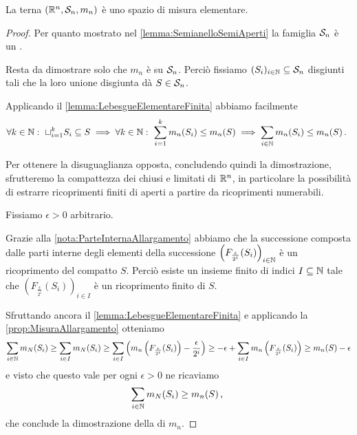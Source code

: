\begin{theorem}\label{thm:LebesguePremisura}
	La terna $(\R^n,\S_n,m_n)$ è uno spazio di misura elementare.
\end{theorem}
\begin{proof}
	Per quanto mostrato nel \cref{lemma:SemianelloSemiAperti} la famiglia $\S_n$ è un \semiring{}.
	
	Resta da dimostrare solo che $m_n$ è \sigadd{} su $\S_n$.
	Perciò fissiamo $(S_i)_{i\in\N}\subseteq \S_n$ disgiunti tali che la loro unione disgiunta dà $S\in\S_n$.
	
	Applicando il \cref{lemma:LebesgueElementareFinita} abbiamo facilmente
	\begin{equation*}
		\forall k\in\N:\ \sqcup_{i=1}^k S_i\subseteq S\implies \forall k\in\N:\ \sum_{i=1}^k m_n(S_i)\le m_n(S) \implies \sum_{i\in\N}m_n(S_i)\le m_n(S) \punto
	\end{equation*}

	Per ottenere la disuguaglianza opposta, concludendo quindi la dimostrazione, sfrutteremo la compattezza dei chiusi e limitati di $\R^n$, in particolare la possibilità di estrarre ricoprimenti finiti di aperti a partire da ricoprimenti numerabili.
	
	Fissiamo $\epsilon>0$ arbitrario.
	
	Grazie alla \cref{nota:ParteInternaAllargamento} abbiamo che la successione composta dalle parti interne degli elementi della successione $\left(F_{\frac\epsilon{2^i}}(S_i)\right)_{i\in\N}$ è un ricoprimento del compatto $S$.
	Perciò esiste un insieme finito di indici $I\subseteq \N$ tale che $\left(F_{\frac\epsilon{2^i}}(S_i)\right)_{i\in I}$ è un ricoprimento finito di $S$.
	
	Sfruttando ancora il \cref{lemma:LebesgueElementareFinita} e applicando la \cref{prop:MisuraAllargamento} otteniamo
	\begin{equation*}
		\sum_{i\in\N}m_N(S_i)\ge \sum_{i\in I}m_N(S_i)\ge \sum_{i\in I}\left(m_n\left(F_{\frac\epsilon{2^i}}(S_i)\right)-\frac\epsilon{2^i}\right)
		\ge -\epsilon+\sum_{i\in I}m_n\left(F_{\frac\epsilon{2^i}}(S_i)\right)\ge m_n(S)-\epsilon
	\end{equation*}
	e visto che questo vale per ogni $\epsilon>0$ ne ricaviamo
	\begin{equation*}
		\sum_{i\in\N}m_N(S_i)\ge m_n(S) \virgola
	\end{equation*}
	che conclude la dimostrazione della \sigadd[ità] di $m_n$.
\end{proof}

